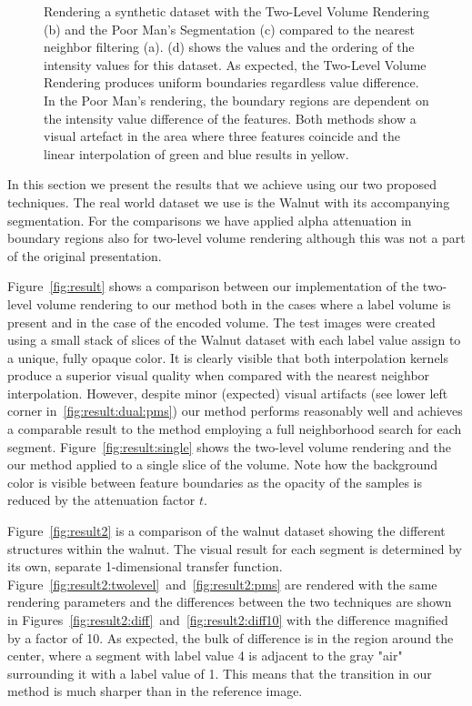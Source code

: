 \documentclass{egpubl}
\begin{document}
\begin{figure}
{		\label{fig:result:synthetic:intensities}
	}
	\caption{Rendering a synthetic dataset with the Two-Level Volume Rendering (b) and the Poor Man's Segmentation (c) compared to the nearest neighbor filtering (a). (d) shows the values and the ordering of the intensity values for this dataset. As expected, the Two-Level Volume Rendering produces uniform boundaries regardless value difference. In the Poor Man's rendering, the boundary regions are dependent on the intensity value difference of the features. Both methods show a visual artefact in the area where three features coincide and the linear interpolation of green and blue results in yellow.}
\end{figure}

In this section we present the results that we achieve using our two proposed techniques. The real world dataset we use is the Walnut with its accompanying segmentation. For the comparisons we have applied alpha attenuation in boundary regions also for two-level volume rendering although this was not a part of the original presentation.

Figure~\ref{fig:result} shows a comparison between our implementation of the two-level volume rendering to our method both in the cases where a label volume is present and in the case of the encoded volume. The test images were created using a small stack of slices of the Walnut dataset with each label value assign to a unique, fully opaque color. It is clearly visible that both interpolation kernels produce a superior visual quality when compared with the nearest neighbor interpolation. However, despite minor (expected) visual artifacts (see lower left corner in~\ref{fig:result:dual:pms}) our method performs reasonably well and achieves a comparable result to the method employing a full neighborhood search for each segment. Figure~\ref{fig:result:single} shows the two-level volume rendering and the our method applied to a single slice of the volume. Note how the background color is visible between feature boundaries as the opacity of the samples is reduced by the attenuation factor $t$.

Figure~\ref{fig:result2} is a comparison of the walnut dataset showing the different structures within the walnut. The visual result for each segment is determined by its own, separate 1-dimensional transfer function. Figure~\ref{fig:result2:twolevel}~and~\ref{fig:result2:pms} are rendered with the same rendering parameters and the differences between the two techniques are shown in Figures~\ref{fig:result2:diff}~and~\ref{fig:result2:diff10} with the difference magnified by a factor of 10. As expected, the bulk of difference is in the region around the center, where a segment with label value 4 is adjacent to the gray "air" surrounding it with a label value of 1. This means that the transition in our method is much sharper than in the reference image.
\end{document}
